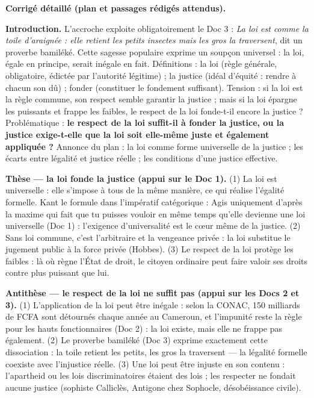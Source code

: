 \documentclass[11pt]{article}
\newcommand{\cle}[1]{{\popxbold\color{popdark}#1}}
\begin{document}
\begin{corrige}
\textbf{Corrigé détaillé (plan et passages rédigés attendus).}

\textbf{Introduction.} L'accroche exploite obligatoirement le Doc 3 : \og \emph{La loi est comme la toile d'araignée : elle retient les petits insectes mais les gros la traversent}, dit un proverbe bamiléké. Cette sagesse populaire exprime un soupçon universel : la loi, égale en principe, serait inégale en fait. \fg{} Définitions : la \cle{loi} (règle générale, obligatoire, édictée par l'autorité légitime) ; la \cle{justice} (idéal d'équité : rendre à chacun son dû) ; \og fonder \fg{} (constituer le fondement suffisant). Tension : si la loi est la règle commune, son respect semble garantir la justice ; mais si la loi épargne les puissants et frappe les faibles, le respect de la loi fonde-t-il encore la justice ? Problématique : \textbf{le respect de la loi suffit-il à fonder la justice, ou la justice exige-t-elle que la loi soit elle-même juste et également appliquée ?} Annonce du plan : la loi comme forme universelle de la justice ; les écarts entre légalité et justice réelle ; les conditions d'une justice effective.

\textbf{Thèse — la loi fonde la justice (appui sur le Doc 1).} (1) La loi est universelle : elle s'impose à tous de la même manière, ce qui réalise l'égalité formelle. Kant le formule dans l'impératif catégorique : \og Agis uniquement d'après la maxime qui fait que tu puisses vouloir en même temps qu'elle devienne une loi universelle \fg{} (Doc 1) : l'exigence d'universalité est le cœur même de la justice. (2) Sans loi commune, c'est l'arbitraire et la vengeance privée : la loi substitue le jugement public à la force privée (Hobbes). (3) Le respect de la loi protège les faibles : là où règne l'État de droit, le citoyen ordinaire peut faire valoir ses droits contre plus puissant que lui.

\textbf{Antithèse — le respect de la loi ne suffit pas (appui sur les Docs 2 et 3).} (1) L'application de la loi peut être inégale : selon la CONAC, 150 milliards de FCFA sont détournés chaque année au Cameroun, et \og l'impunité reste la règle pour les hauts fonctionnaires \fg{} (Doc 2) : la loi existe, mais elle ne frappe pas également. (2) Le proverbe bamiléké (Doc 3) exprime exactement cette dissociation : la toile retient les petits, les gros la traversent — la légalité formelle coexiste avec l'injustice réelle. (3) Une loi peut être injuste en son contenu : l'apartheid ou les lois discriminatoires étaient des lois ; les respecter ne fondait aucune justice (sophiste Calliclès, Antigone chez Sophocle, désobéissance civile).


\end{corrige}
\end{document}
